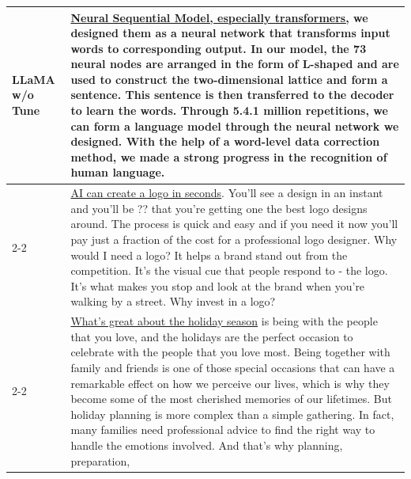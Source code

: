 \begin{table}[h]
{\begin{tabular}{p{0.8cm}|p{9.8cm}}
        \midrule
        \multirow{16}{*}{\parbox{0.8cm}{LLaMA w/o Tune}} & \underline{Neural Sequential Model, especially transformers,} we designed them as a neural network that transforms input words to corresponding output. In our model, the 73 neural nodes are arranged in the form of L-shaped and are used to construct the two-dimensional lattice and form a sentence. This sentence is then transferred to the decoder to learn the words. Through 5.4.1 million repetitions, we can form a language model through the neural network we designed. With the help of a word-level data correction method, we made a strong progress in the recognition of human language. \\
        \cmidrule{2-2}
         & \underline{AI can create a logo in seconds}. You'll see a design in an instant and you'll be ?? that you're getting one the best logo designs around. The process is quick and easy and if you need it now you'll pay just a fraction of the cost for a professional logo designer. Why would I need a logo? It helps a brand stand out from the competition. It's the visual cue that people respond to - the logo. It's what makes you stop and look at the brand when you're walking by a street. Why invest in a logo? \\
        \cmidrule{2-2}
         & \underline{What’s great about the holiday season} is being with the people that you love, and the holidays are the perfect occasion to celebrate with the people that you love most. Being together with family and friends is one of those special occasions that can have a remarkable effect on how we perceive our lives, which is why they become some of the most cherished memories of our lifetimes. But holiday planning is more complex than a simple gathering. In fact, many families need professional advice to find the right way to handle the emotions involved. And that’s why planning, preparation, \\
        \bottomrule
    \end{tabular}
    }
\end{table}


